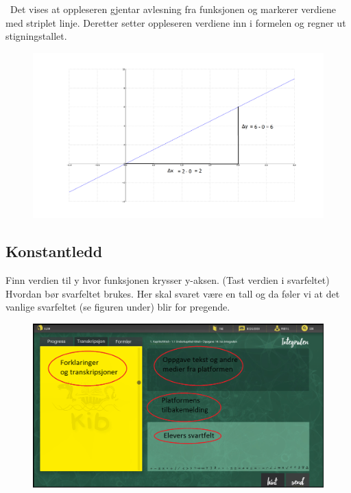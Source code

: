 \documentclass[12pt,twoside,onecolumn]{article}
\begin{document}
\begin{Exercise}
{\color{PineGreen} Det vises at oppleseren gjentar avlesning fra funksjonen og markerer verdiene med striplet linje. Deretter setter oppleseren verdiene inn i formelen og regner ut stigningstallet.}
\begin{figure}[h!]
\centering
\includegraphics[scale = 0.3]{figures/stigningstalleksempelet.png}
\end{figure}
\end{Exercise}

\newpage
\subsection*{Konstantledd}

\begin{Exercise}
Finn verdien til y hvor funksjonen krysser y-aksen. (Tast verdien i svarfeltet) {\color{Cerulean} Hvordan bør svarfeltet brukes. Her skal svaret være en tall og da føler vi at det vanlige svarfeltet (se figuren under) blir for pregende.}
\begin{figure}[h!]
\centering
\includegraphics[scale = 0.3]{figures/Platform_explained.png}
\end{figure}
\end{Exercise}
\end{document}
